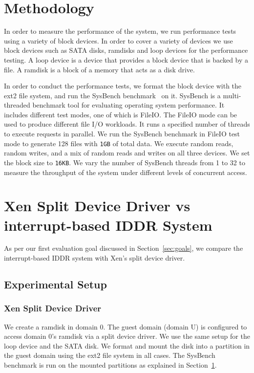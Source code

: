 \section{Methodology}
\label{sec:methodology}
In order to measure the performance of the system, we run performance
tests using a variety of block devices. In order to cover a variety of
devices we use block devices such as SATA disks, ramdisks and loop
devices for the performance testing. A loop device is a device that provides 
a block device that is backed by a file.  A ramdisk is a block of a memory
that acts as a disk drive.

In order to conduct the performance tests, we format the block
device with the ext2 file system, and run the SysBench
benchmark~\cite{sysbench} on it. SysBench is a multi-threaded benchmark
tool for evaluating operating system performance. It includes different test
modes, one of which is FileIO.  The FileIO mode can be used to produce
different file I/O workloads. It runs a specified number of threads to
execute requests in parallel. We run the SysBench benchmark in FileIO
test mode to generate 128 files with \texttt{1GB} of total data. We
execute random reads, random writes, and a mix of random reads and writes
on all three devices. We set the block size to \texttt{16KB}. We vary
the number of SysBench threads from 1 to 32 to measure the throughput of
the system under different levels of concurrent access.

\section{Xen Split Device Driver vs interrupt-based IDDR System}
As per our first evaluation goal discussed in Section~\ref{sec:goals},
we compare the interrupt-based IDDR system with Xen's split device driver.

\subsection*{Experimental Setup}

\subsubsection*{Xen Split Device Driver}
We create a ramdisk in domain 0. The guest domain (domain U) is configured
to access domain 0's ramdisk via a split device driver. 
We use the same setup for the loop device and the SATA disk. 
We format and mount the disk into a partition in the
guest domain using the ext2 file system in all cases. The SysBench 
benchmark is run on the mounted partitions as explained in 
Section~\ref{sec:methodology}.

